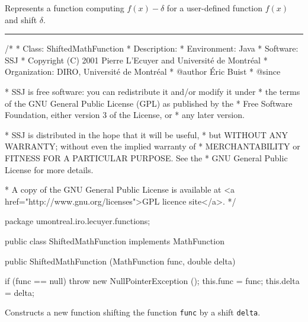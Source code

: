 
Represents a function computing $f(x) - \delta$ for a user-defined function
$f(x)$ and shift $\delta$.

\bigskip\hrule

\begin{code}
\begin{hide}
/*
 * Class:        ShiftedMathFunction
 * Description:  
 * Environment:  Java
 * Software:     SSJ 
 * Copyright (C) 2001  Pierre L'Ecuyer and Université de Montréal
 * Organization: DIRO, Université de Montréal
 * @author       Éric Buist
 * @since

 * SSJ is free software: you can redistribute it and/or modify it under
 * the terms of the GNU General Public License (GPL) as published by the
 * Free Software Foundation, either version 3 of the License, or
 * any later version.

 * SSJ is distributed in the hope that it will be useful,
 * but WITHOUT ANY WARRANTY; without even the implied warranty of
 * MERCHANTABILITY or FITNESS FOR A PARTICULAR PURPOSE.  See the
 * GNU General Public License for more details.

 * A copy of the GNU General Public License is available at
   <a href="http://www.gnu.org/licenses">GPL licence site</a>.
 */
\end{hide}
package umontreal.iro.lecuyer.functions;\begin{hide}

\end{hide}

public class ShiftedMathFunction implements MathFunction\begin{hide}

,
      MathFunctionWithFirstDerivative, MathFunctionWithDerivative,
      MathFunctionWithIntegral {
   MathFunction func;
   double delta;
\end{hide}

   public ShiftedMathFunction (MathFunction func, double delta)\begin{hide} {
      if (func == null)
         throw new NullPointerException ();
      this.func = func;
      this.delta = delta;
   }\end{hide}
\end{code}
\begin{tabb}   Constructs a new function shifting the function \texttt{func} by
 a shift \texttt{delta}.
\end{tabb}
\begin{htmlonly}
\end{htmlonly}
